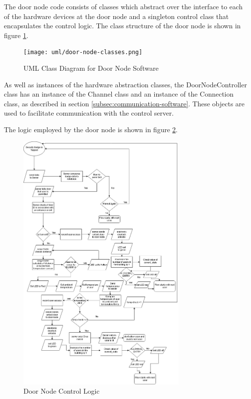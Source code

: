 The door node code consists of classes which abstract over the interface to each
of the hardware devices at the door node and a singleton control class that
encapsulates the control logic. The class structure of the door node is shown in
figure \ref{fig:door-node-classes}.

\begin{figure}[!htb]
\centering
\texttt{[image: uml/door-node-classes.png]}
\caption{UML Class Diagram for Door Node Software}
\label{fig:door-node-classes}
\end{figure}

As well as instances of the hardware abstraction classes, the DoorNodeController
class has an instance of the Channel class and an instance of the Connection
class, as described in section \ref{subsec:communication-software}. These
objects are used to facilitate communication with the control server.

The logic employed by the door node is shown in figure
\ref{fig:door-node-logic}.

\begin{figure}[!htb]
\centering
\includegraphics[width=0.75\textwidth]{images/door-node-flow.png}
\caption{Door Node Control Logic}
\label{fig:door-node-logic}
\end{figure}


